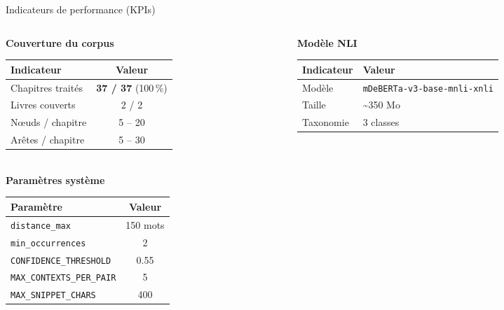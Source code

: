 \documentclass[aspectratio=169]{beamer}
\begin{document}
\begin{frame}{Indicateurs de performance (KPIs)}
  \begin{columns}[T]
    \begin{column}{0.48\textwidth}
      \textbf{Couverture du corpus}\\[2pt]
      \footnotesize
      \setlength{\tabcolsep}{3pt}
      \renewcommand{\arraystretch}{1.1}
      \begin{tabular}{lc}
        \toprule
        Indicateur & Valeur \\
        \midrule
        Chapitres traités        & \textbf{37 / 37} (100\,\%) \\
        Livres couverts          & 2 / 2 \\
        Nœuds / chapitre         & 5 -- 20 \\
        Arêtes / chapitre        & 5 -- 30 \\
        \bottomrule
      \end{tabular}
      \vspace{4pt}\\
      \textbf{Paramètres système}\\[2pt]
      \begin{tabular}{lc}
        \toprule
        Paramètre & Valeur \\
        \midrule
        \texttt{distance\_max}         & 150 mots \\
        \texttt{min\_occurrences}      & 2 \\
        \texttt{CONFIDENCE\_THRESHOLD} & 0.55 \\
        \texttt{MAX\_CONTEXTS\_PER\_PAIR} & 5 \\
        \texttt{MAX\_SNIPPET\_CHARS}   & 400 \\
        \bottomrule
      \end{tabular}
    \end{column}
    \begin{column}{0.48\textwidth}
      \textbf{Modèle NLI}\\[2pt]
      \footnotesize
      \setlength{\tabcolsep}{3pt}
      \renewcommand{\arraystretch}{1.1}
      \begin{tabular}{lp{3.5cm}}
        \toprule
        Indicateur & Valeur \\
        \midrule
        Modèle        & \texttt{mDeBERTa-v3-base-mnli-xnli} \\
        Taille        & \textasciitilde{}350 Mo \\
        Taxonomie     & 3 classes \\

\end{tabular}
\end{column}
\end{columns}
\end{frame}
\end{document}
